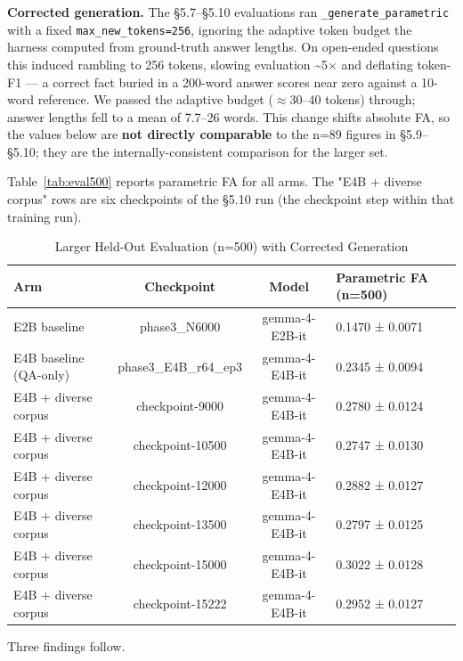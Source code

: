\documentclass[10pt,twocolumn]{article}
\begin{document}
\textbf{Corrected generation.} The \S{}5.7--\S{}5.10 evaluations ran \texttt{\_generate\_parametric} with a fixed \texttt{max\_new\_tokens=256}, ignoring the adaptive token budget the harness computed from ground-truth answer lengths. On open-ended questions this induced rambling to 256 tokens, slowing evaluation \textasciitilde{}5$\times$ and deflating token-F1 --- a correct fact buried in a 200-word answer scores near zero against a 10-word reference. We passed the adaptive budget ($\approx$30--40 tokens) through; answer lengths fell to a mean of 7.7--26 words. This change shifts absolute FA, so the values below are \textbf{not directly comparable} to the n=89 figures in \S{}5.9--\S{}5.10; they are the internally-consistent comparison for the larger set.


Table~\ref{tab:eval500} reports parametric FA for all arms. The "E4B + diverse corpus" rows are six checkpoints of the \S{}5.10 run (the checkpoint step within that training run).


\begin{table}[htbp]
  \centering\small
  \caption{Larger Held-Out Evaluation (n=500) with Corrected Generation}
  \label{tab:larger-held-out-evaluation-n-500-with-corrected-generation}
  \begin{tabularx}{\textwidth}{LccL}
  \toprule
    Arm & Checkpoint & Model & Parametric FA (n=500) \\
  \midrule
  \midrule
  E2B baseline & phase3\_N6000 & gemma-4-E2B-it & 0.1470 ± 0.0071 \\
  E4B baseline (QA-only) & phase3\_E4B\_r64\_ep3 & gemma-4-E4B-it & 0.2345 ± 0.0094 \\
  E4B + diverse corpus & checkpoint-9000 & gemma-4-E4B-it & 0.2780 ± 0.0124 \\
  E4B + diverse corpus & checkpoint-10500 & gemma-4-E4B-it & 0.2747 ± 0.0130 \\
  E4B + diverse corpus & checkpoint-12000 & gemma-4-E4B-it & 0.2882 ± 0.0127 \\
  E4B + diverse corpus & checkpoint-13500 & gemma-4-E4B-it & 0.2797 ± 0.0125 \\
  E4B + diverse corpus & checkpoint-15000 & gemma-4-E4B-it & 0.3022 ± 0.0128 \\
  E4B + diverse corpus & checkpoint-15222 & gemma-4-E4B-it & 0.2952 ± 0.0127 \\
  \bottomrule
  \end{tabularx}
\end{table}


Three findings follow.
\end{document}
